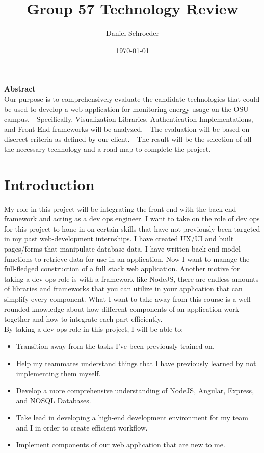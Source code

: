 \documentclass[onecolumn, draftclsnofoot,10pt, compsoc]{IEEEtran}
\title{\textbf{\CapstoneProjectName} \linebreak \LARGE{Group 57} \linebreak \LARGE{Technology Review}}
\author{Daniel Schroeder}
\date{\today}
\begin{document}
\maketitle
\vfill
\noindent \textbf{Abstract} \\
            \indent 
            Our purpose is to comprehensively evaluate the candidate technologies that could be used to develop a web application for monitoring energy usage on the OSU campus.  Specifically, Visualization Libraries, Authentication Implementations, and Front-End frameworks will be analyzed.  The evaluation will be based on discreet criteria as defined by our client.  The result will be the selection of all the necessary technology and a road map to complete the project.

\newpage
{}
\tableofcontents
\clearpage

\section{Introduction}
My role in this project will be integrating the front-end with the back-end framework and acting as a dev ops engineer. I want to take on the role of dev ops for this project to hone in on certain skills that have not previously been targeted in my past web-development internships. I have created UX/UI and built pages/forms that  manipulate database data. I have written back-end model functions to retrieve data for use in an application. Now I want to manage the full-fledged construction of a full stack web application. Another motive for taking a dev ops role is with a framework like NodeJS, there are endless amounts of libraries and frameworks that you can utilize in your application that can simplify every component. What I want to take away from this course is a well-rounded knowledge about how different components of an application work together and how to integrate each part efficiently.\\
By taking a dev ops role in this project, I will be able to:
\begin{itemize}
    \item Transition away from the tasks I've been previously trained on.
    \item Help my teammates understand things that I have previously learned by not implementing them myself.
    \item Develop a more comprehensive understanding of NodeJS, Angular, Express, and NOSQL Databases.
    \item Take lead in developing a high-end development environment for my team and I in order to create efficient workflow.
    \item Implement components of our web application that are new to me.
\end{itemize}
\end{document}
